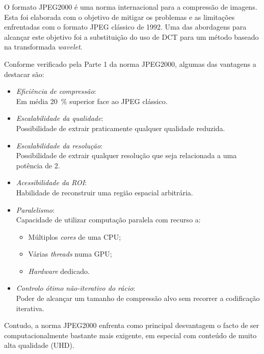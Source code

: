 O formato JPEG2000 é uma norma internacional para a compressão de imagens. Esta foi elaborada com o objetivo de mitigar os problemas e as limitações enfrentadas com o formato \ac{JPEG} clássico de 1992. Uma das abordagens para alcançar este objetivo foi a substituição do uso de \ac{DCT} para um método baseado na transformada \textit{wavelet}\cite{Taubman2002}.

Conforme verificado pela Parte 1 da norma JPEG2000, algumas das vantagens a destacar são\cite{Pierre-AnthonyLemieux,Taubman2002}:
\begin{itemize}
  \item \textit{Eficiência de compressão}:\\ Em média \SI{20}{\percent} superior face ao \ac{JPEG} clássico.
  \item \textit{Escalabilidade da qualidade}:\\ Possibilidade de extrair praticamente qualquer qualidade reduzida.
  \item \textit{Escalabilidade da resolução}:\\ Possibilidade de extrair qualquer resolução que seja relacionada a uma potência de 2.
  \item \emph{Acessibilidade da \ac{ROI}}:\\ Habilidade de reconstruir uma região espacial arbitrária.
  \item \textit{Paralelismo}:\\ Capacidade de utilizar computação paralela com recurso a:
  \begin{itemize}
    \item Múltiplos \textit{cores} de uma \ac{CPU};
    \item Várias \textit{threads} numa \ac{GPU};
    \item \textit{Hardware} dedicado.
  \end{itemize}
  \item \textit{Controlo ótimo não-iterativo do rácio}:\\ Poder de alcançar um tamanho de compressão alvo sem recorrer a codificação iterativa.
\end{itemize}

Contudo, a norma JPEG2000 enfrenta como principal desvantagem o facto de ser computacionalmente bastante mais exigente, em especial com conteúdo de muito alta qualidade (\ac{UHD}).

